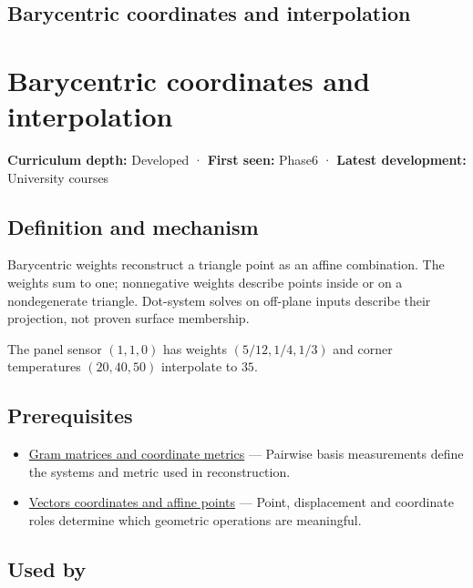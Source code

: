 \hypertarget{appendix-02b9d9a81dca}{}
\section*{Barycentric coordinates and interpolation}
\chapter{Barycentric coordinates and interpolation}\label{appendix-02b9d9a81dca-barycentric-coordinates-and-interpolation}

\textbf{Curriculum depth:} Developed · \textbf{First seen:} Phase6 · \textbf{Latest development:} University courses

\section{Definition and mechanism}\label{appendix-02b9d9a81dca-definition-and-mechanism}

Barycentric weights reconstruct a triangle point as an affine combination. The weights sum to one; nonnegative weights describe points inside or on a nondegenerate triangle. Dot-system solves on off-plane inputs describe their projection, not proven surface membership.

The panel sensor \((1,1,0)\) has weights \((5/12,1/4,1/3)\) and corner temperatures \((20,40,50)\) interpolate to \(35\).

\section{Prerequisites}\label{appendix-02b9d9a81dca-prerequisites}

\begin{itemize}
\tightlist
\item
  \hyperref[appendix-3b863809f82a]{Gram matrices and coordinate metrics} --- Pairwise basis measurements define the systems and metric used in reconstruction.
\item
  \hyperref[appendix-0659864c0aa3]{Vectors coordinates and affine points} --- Point, displacement and coordinate roles determine which geometric operations are meaningful.
\end{itemize}

\section{Used by}\label{appendix-02b9d9a81dca-used-by}

